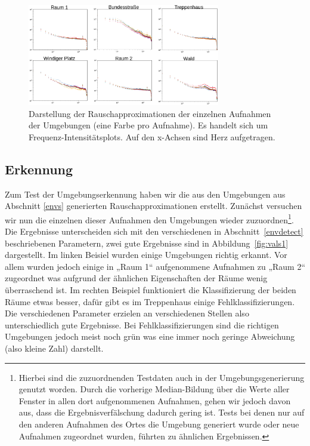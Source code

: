 \documentclass[
	fontsize=10.5pt,
	marginpar=false,
	ngerman,
	accentcolor=3d
	]{tudapub}
\begin{document}
\begin{figure}[h]
	\centering
	\includegraphics[width=0.75\textwidth]{media/envs2}
	\caption{Darstellung der Rauschapproximationen der einzelnen Aufnahmen der Umgebungen (eine Farbe pro Aufnahme). Es handelt sich um Frequenz-Intensitätsplots. Auf den x-Achsen sind Herz aufgetragen.}
	\label{fig:envs2}
\end{figure}



\pagebreak
\subsection{Erkennung}
\label{erkennung}

Zum Test der Umgebungserkennung haben wir die aus den Umgebungen aus Abschnitt \ref{envs} generierten Rauschapproximationen erstellt. Zunächst versuchen wir nun die einzelnen dieser Aufnahmen den Umgebungen wieder zuzuordnen\footnote{Hierbei sind die zuzuordnenden Testdaten auch in der Umgebungsgenerierung genutzt worden. Durch die vorherige Median-Bildung über die Werte aller Fenster in allen dort aufgenommenen Aufnahmen, gehen wir jedoch davon aus, dass die Ergebnisverfälschung dadurch gering ist. Tests bei denen nur auf den anderen Aufnahmen des Ortes die Umgebung generiert wurde oder neue Aufnahmen zugeordnet wurden, führten zu ähnlichen Ergebnissen.}. Die Ergebnisse unterscheiden sich mit den verschiedenen in Abschnitt~\ref{envdetect} beschriebenen Parametern, zwei gute Ergebnisse sind in Abbildung~\ref{fig:vals1} dargestellt. Im linken Beisiel wurden einige Umgebungen richtig erkannt. Vor allem wurden jedoch einige in „Raum 1“ aufgenommene Aufnahmen zu „Raum 2“ zugeordnet was aufgrund der ähnlichen Eigenschaften der Räume wenig überraschend ist. Im rechten Beispiel funktioniert die Klassifizierung der beiden Räume etwas besser, dafür gibt es im Treppenhaus einige Fehlklassifizierungen. Die verschiedenen Parameter erzielen an verschiedenen Stellen also unterschiedlich gute Ergebnisse. Bei Fehlklassifizierungen sind die richtigen Umgebungen jedoch meist noch grün was eine immer noch geringe Abweichung (also kleine Zahl) darstellt.
\end{document}
